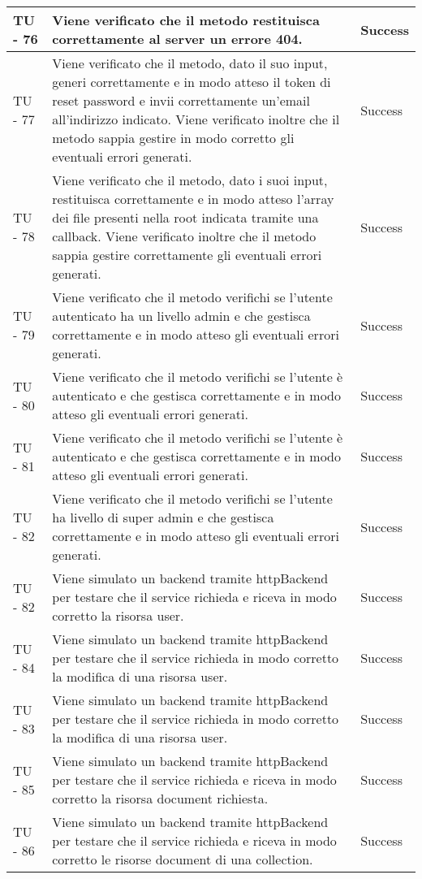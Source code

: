 \begin{center}
\begin{longtable}{ | p{3cm} | p{9cm} | p{2cm} | }
TU - 76 & Viene verificato che il metodo restituisca correttamente al server un errore 404. & Success \\ \hline
TU - 77 & Viene verificato che il metodo, dato il suo input, generi correttamente e in modo atteso il token di reset password e invii correttamente un'email all'indirizzo indicato. Viene verificato inoltre che il metodo sappia gestire in modo corretto gli eventuali errori generati. & Success \\ \hline
TU - 78 & Viene verificato che il metodo, dato i suoi input, restituisca correttamente e in modo atteso l'array dei file presenti nella root indicata tramite una callback. Viene verificato inoltre che il metodo sappia gestire correttamente gli eventuali errori generati. & Success \\ \hline
TU - 79 & Viene verificato che il metodo verifichi se l'utente autenticato ha un livello admin e che gestisca correttamente e in modo atteso gli eventuali errori generati. & Success \\ \hline
TU - 80 & Viene verificato che il metodo verifichi se l'utente è autenticato e che gestisca correttamente e in modo atteso gli eventuali errori generati. & Success \\ \hline
TU - 81 & Viene verificato che il metodo verifichi se l'utente è autenticato e che gestisca correttamente e in modo atteso gli eventuali errori generati. & Success \\ \hline
TU - 82 & Viene verificato che il metodo verifichi se l'utente ha livello di super admin e che gestisca correttamente e in modo atteso gli eventuali errori generati. & Success \\ \hline
TU - 82 & Viene simulato un backend tramite httpBackend per testare che il service richieda e riceva in modo corretto la risorsa user. & Success \\ \hline
TU - 84 & Viene simulato un backend tramite httpBackend per testare che il service richieda in modo corretto la modifica di una risorsa user. & Success \\ \hline
TU - 83 & Viene simulato un backend tramite httpBackend per testare che il service richieda in modo corretto la modifica di una risorsa user. & Success \\ \hline
TU - 85 & Viene simulato un backend tramite httpBackend per testare che il service richieda e riceva in modo corretto la risorsa document richiesta. & Success \\ \hline
TU - 86 & Viene simulato un backend tramite httpBackend per testare che il service richieda e riceva in modo corretto le risorse document di una collection. & Success \\ \hline

\end{longtable}
\end{center}

